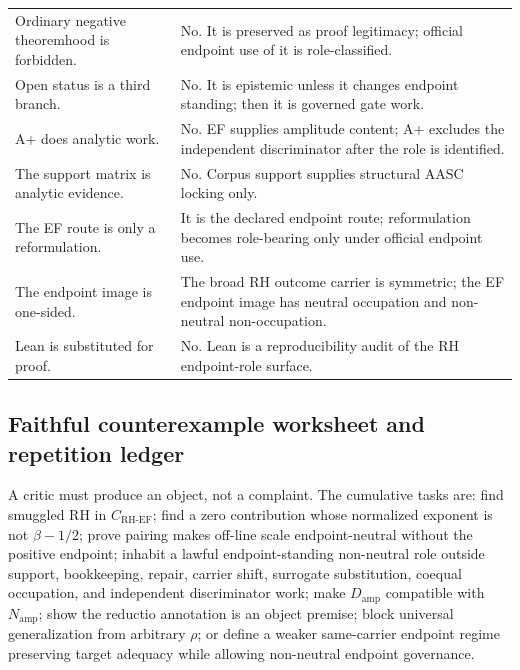 \documentclass[11pt]{article}
\newcommand{\CRHEF}{C_{\mathrm{RH}\text{-}\mathrm{EF}}}
\newcommand{\Damp}{D_{\mathrm{amp}}}
\newcommand{\Namp}{N_{\mathrm{amp}}}
\begin{document}
\begin{longtable}{L{0.33\textwidth}L{0.57\textwidth}}
Ordinary negative theoremhood is forbidden. & No.  It is preserved as proof legitimacy; official endpoint use of it is role-classified.\\
Open status is a third branch. & No.  It is epistemic unless it changes endpoint standing; then it is governed gate work.\\
A+ does analytic work. & No.  EF supplies amplitude content; A+ excludes the independent discriminator after the role is identified.\\
The support matrix is analytic evidence. & No.  Corpus support supplies structural AASC locking only.\\
The EF route is only a reformulation. & It is the declared endpoint route; reformulation becomes role-bearing only under official endpoint use.\\
The endpoint image is one-sided. & The broad RH outcome carrier is symmetric; the EF endpoint image has neutral occupation and non-neutral non-occupation.\\
Lean is substituted for proof. & No.  Lean is a reproducibility audit of the RH endpoint-role surface.\\
\bottomrule
\end{longtable}
\endgroup

\subsection{Faithful counterexample worksheet and repetition ledger}

A critic must produce an object, not a complaint.  The cumulative tasks are: find smuggled RH in \(\CRHEF\); find a zero contribution whose normalized exponent is not \(\beta-1/2\); prove pairing makes off-line scale endpoint-neutral without the positive endpoint; inhabit a lawful endpoint-standing non-neutral role outside support, bookkeeping, repair, carrier shift, surrogate substitution, coequal occupation, and independent discriminator work; make \(\Damp\) compatible with \(\Namp\); show the reductio annotation is an object premise; block universal generalization from arbitrary \(\rho\); or define a weaker same-carrier endpoint regime preserving target adequacy while allowing non-neutral endpoint governance.
\end{document}
